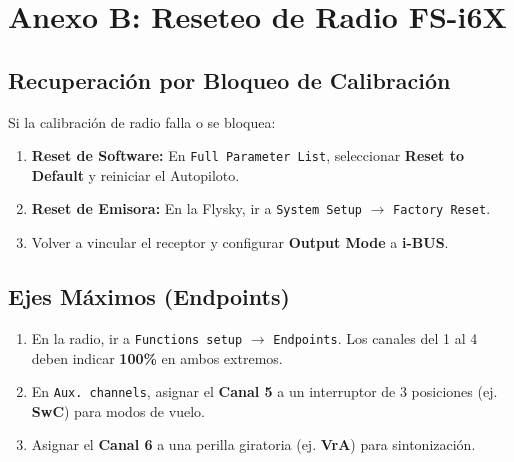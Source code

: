 \documentclass[11pt,a4paper]{article}
\begin{document}
\vspace{1cm} %
\section{Anexo B: Reseteo de Radio FS-i6X}
\subsection{Recuperación por Bloqueo de Calibración}
Si la calibración de radio falla o se bloquea:
\begin{enumerate}[leftmargin=*,noitemsep]
    \item \textbf{Reset de Software:} En \texttt{Full Parameter List}, seleccionar \textbf{Reset to Default} y reiniciar el Autopiloto.
    \item \textbf{Reset de Emisora:} En la Flysky, ir a \texttt{System Setup} $\rightarrow$ \texttt{Factory Reset}.
    \item Volver a vincular el receptor y configurar \textbf{Output Mode} a \textbf{i-BUS}.
\end{enumerate}

\subsection{Ejes Máximos (Endpoints)}
\begin{enumerate}[leftmargin=*,noitemsep]
    \item En la radio, ir a \texttt{Functions setup} $\rightarrow$ \texttt{Endpoints}. Los canales del 1 al 4 deben indicar \textbf{100\%} en ambos extremos.
    \item En \texttt{Aux. channels}, asignar el \textbf{Canal 5} a un interruptor de 3 posiciones (ej. \textbf{SwC}) para modos de vuelo.
    \item Asignar el \textbf{Canal 6} a una perilla giratoria (ej. \textbf{VrA}) para sintonización.
\end{enumerate}

\newpage
\end{document}
